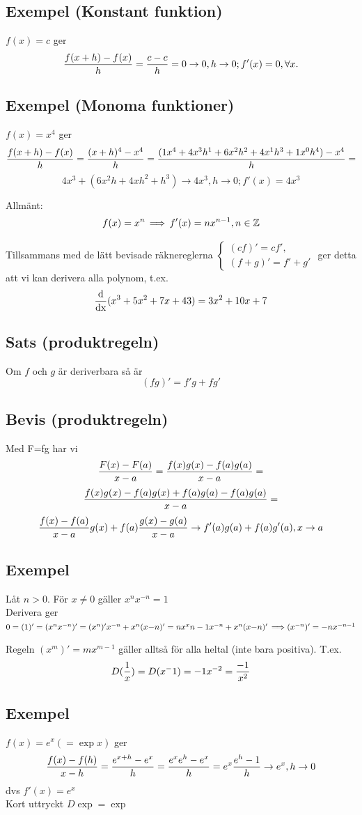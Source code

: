 \documentclass{article}
\begin{document}
\subsection{Exempel (Konstant funktion)}
$ f(x) = c $ ger
$$ \frac{f(x+h)-f(x)}{h} = \frac{c-c}{h} = 0 \to 0, h \to 0; f'(x) = 0, \forall x. $$

\subsection{Exempel (Monoma funktioner)}
$ f(x) = x^4 $ ger 
$$ \frac{f(x+h)-f(x)}{h} = \frac{(x+h)^4 - x^4}{h} = \frac{(1x^4 + 4x^3h^1 + 6x^2h^2+4x^1h^3+1x^0h^4)-x^4}{h} =$$
$$4x^3+(6x^2h + 4xh^2+h^3) \to 4x^3, h\to 0; f'(x) = 4x^3$$

Allmänt:
$$ f(x) = x^n \operatorname{\implies} f'(x) = nx^{n-1}, n\in{\mathbb Z}$$

Tillsammans med de lätt bevisade räknereglerna
$
\begin{cases}
(cf)' = cf',\\
(f+g)' = f' + g'
\end{cases}
$
ger detta att vi kan derivera alla polynom, t.ex.
$$ \operatorname{\frac{d}{dx}} (x^3+5x^2+7x+43) = 3x^2+10x+7 $$

\subsection{Sats (produktregeln)}
Om $f$ och $g$ är deriverbara så är
$$ (fg)' = f'g + fg' $$

\subsection{Bevis (produktregeln)}
Med F=fg har vi
$$ \frac{F(x)-F(a)}{x-a} = \frac{f(x)g(x) - f(a)g(a)}{x-a} = $$
$$ \frac{f(x)g(x) - f(a)g(x) + f(a)g(a) - f(a)g(a)}{x-a}  = $$
$$ \frac{f(x)-f(a)}{x-a}g(x) + f(a)\frac{g(x)-g(a)}{x-a} \to f'(a)g(a)+f(a)g'(a), x\to a $$

\subsection{Exempel}
Låt $n>0$. För $x\neq 0$ gäller $x^nx^{-n}=1$\\
Derivera ger
$0 = (1)' = (x^nx^{-n})' = (x^n)'x^{-n} + x^n(x{-n})'
= nx^x{n-1}x^{-n} + x^n(x{-n})' \operatorname{\implies} (x^{-n})' = -nx^{-n-1}$

Regeln $(x^m)' = mx^{m-1}$ gäller alltså för alla heltal (inte bara positiva).
T.ex. $$D(\frac{1}{x}) = D(x^-1) = -1x^{-2} = \frac{-1}{x^2}$$

\subsection{Exempel}
$ f(x)=e^x (= \exp x) $ ger
$$ \frac{f(x)-f(h)}{x-h} = \frac{e^{x+h} - e^x}{h} = \frac{e^xe^h - e^x}{h} = e^x\frac{e^h-1}{h} \to e^x, h\to 0 $$
dvs $f'(x) = e^x$\\
Kort uttryckt $D\exp = \exp$
\end{document}
